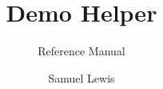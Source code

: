 \documentclass{technical-reference-manual}
\title{Demo Helper}
\subtitle{Reference Manual}
\author{Samuel Lewis}
\begin{document}
	
	\graphicspath{ {./assets/} }
	
	\maketitle
	
	\tableofcontents
	\newpage
	
	
	\pagebreak
	
	
	
\end{document}
